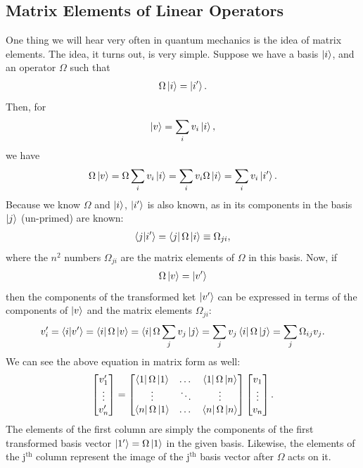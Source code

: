 \documentclass{book}
\theoremstyle{definition}
\begin{document}
\subsection{Matrix Elements of Linear Operators}
One thing we will hear very often in quantum mechanics is the idea of matrix elements. The idea, it turns out, is very simple. Suppose we have a basis $\ket{i}$, and an operator $\Omega$ such that
\begin{align}
\Omega\ket{i} = \ket{i'}.
\end{align}
Then, for
\begin{align}
\ket{v} = \sum_i v_i \ket{i}, 
\end{align}
we have
\begin{align}
\Omega\ket{v} = \Omega \sum_i v_i \ket{i} = \sum_i v_i \Omega\ket{i} = \sum_i v_i \ket{i'}.
\end{align}
Because we know $\Omega$ and $\ket{i}$, $\ket{i'}$ is also known, as in its components in the basis $\ket{j}$ (un-primed) are known:
\begin{align}
\braket{j}{i'} = \bra{j}\Omega\ket{i} \equiv \Omega_{ji},
\end{align}
where the $n^2$ numbers $\Omega_{ji}$ are the matrix elements of $\Omega$ in this basis. Now, if
\begin{align}
\Omega\ket{v} = \ket{v'}
\end{align}
then the components of the transformed ket $\ket{v'}$ can be expressed in terms of the components of $\ket{v}$ and the matrix elements $\Omega_{ji}$:
\begin{align}
v_i' = \braket{i}{v'} = \bra{i}\Omega\ket{v} = \bra{i}\Omega \sum_j v_j \ket{j} = \sum_j v_j \bra{i}\Omega\ket{j} = \sum_j \Omega_{ij}v_j.
\end{align}
We can see the above equation in matrix form as well:
\begin{align}
\begin{bmatrix}
v_1'  \\ \vdots \\ v_n'
\end{bmatrix}
=
\begin{bmatrix}
\bra{1}\Omega\ket{1} &  \dots & \bra{1}\Omega\ket{n} \\
\vdots & \ddots & \vdots\\	
\bra{n}\Omega\ket{1} & \dots & \bra{n}\Omega\ket{n} \\
\end{bmatrix}
\begin{bmatrix}
v_1 \\ \vdots \\ v_n 
\end{bmatrix}.
\end{align}
The elements of the first column are simply the components of the first transformed basis vector $\ket{1'} = \Omega\ket{1}$ in the given basis. Likewise, the elements of the j$^{\text{th}}$ column represent the image of the j$^\text{th}$ basis vector after $\Omega$ acts on it. 
\end{document}
